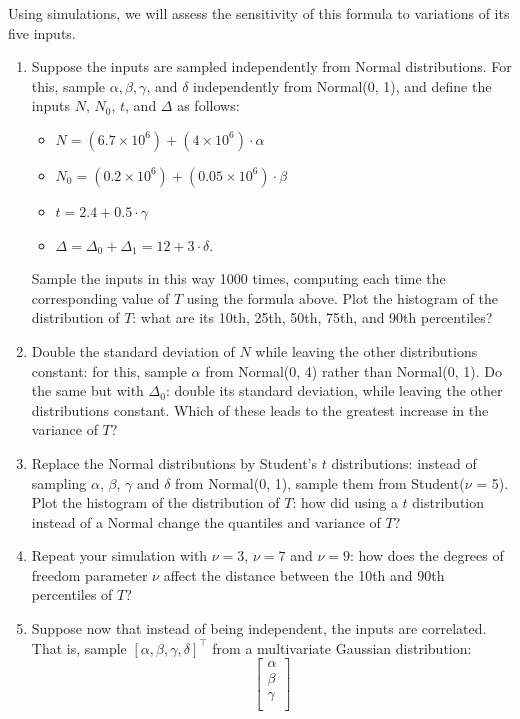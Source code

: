 \documentclass[11pt]{article}
\begin{document}
Using simulations, we will assess the sensitivity of this formula to variations of its five inputs.

\begin{enumerate}
	\item Suppose the inputs are sampled independently from Normal distributions. For this, sample $\alpha, \beta, \gamma$, and $\delta$ independently from Normal(0, 1), and define the inputs $N$, $N_0$, $t$, and $\Delta$ as follows:
	\begin{itemize}
		\item $N = (6.7 \times 10^6) + (4 \times 10^6) \cdot \alpha$ 
		\item $N_0 = (0.2 \times 10^6) + (0.05 \times 10^6) \cdot \beta$
		\item $t = 2.4 + 0.5 \cdot \gamma$
		\item $\Delta = \Delta_0 + \Delta_1 = 12 + 3 \cdot \delta$.
	\end{itemize}
	Sample the inputs in this way 1000 times, computing each time the corresponding value of $T$ using the formula above. Plot the histogram of the distribution of $T$: what are its 10th, 25th, 50th, 75th, and 90th percentiles?
	\item Double the standard deviation of $N$ while leaving the other distributions constant: for this, sample $\alpha$ from Normal(0, 4) rather than Normal(0, 1). Do the same but with $\Delta_0$: double its standard deviation, while leaving the other distributions constant. Which of these leads to the greatest increase in the variance of $T$?
	\item Replace the Normal distributions by Student's $t$ distributions: instead of sampling $\alpha$, $\beta$, $\gamma$ and $\delta$ from Normal(0, 1), sample them from Student($\nu$ = 5). Plot the histogram of the distribution of $T$: how did using a $t$ distribution instead of a Normal change the quantiles and variance of $T$? 
	\item Repeat your simulation with $\nu = 3$, $\nu = 7$ and $\nu = 9$: how does the degrees of freedom parameter $\nu$ affect the distance between the 10th and 90th percentiles of $T$?
	\item Suppose now that instead of being independent, the inputs are correlated. That is, sample $[\alpha, \beta, \gamma, \delta]^\top$ from a multivariate Gaussian distribution: 
		$$
		\begin{bmatrix}
			\alpha\\
			\beta\\
			\gamma\\

\end{bmatrix}$$
\end{enumerate}
\end{document}
